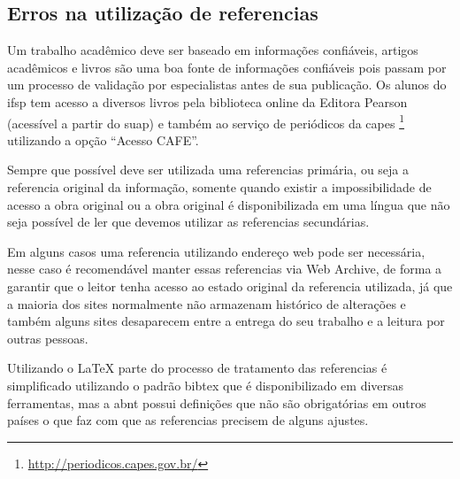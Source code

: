 \subsection{Erros na utilização de referencias}
\label{erros-referencias}

Um trabalho acadêmico deve ser baseado em informações confiáveis, artigos acadêmicos e livros são uma boa fonte de informações confiáveis pois passam por um processo de validação por especialistas antes de sua publicação. Os alunos do \ac{ifsp} tem acesso a diversos livros pela biblioteca online da Editora  Pearson (acessível a partir do \ac{suap}) e também ao serviço de periódicos da \ac{capes} \footnote{\url{http://periodicos.capes.gov.br/}} utilizando a opção \enquote{Acesso CAFE}.

Sempre que possível deve ser utilizada uma referencias primária, ou seja a referencia original da informação, somente quando existir a impossibilidade de acesso a obra original ou a obra original é disponibilizada em uma língua que não seja possível de ler que devemos utilizar as referencias secundárias.

Em alguns casos uma referencia utilizando endereço web pode ser necessária, nesse caso é recomendável manter essas referencias via  Web Archive, de forma a garantir que o leitor tenha acesso ao estado original da referencia utilizada, já que a maioria dos sites normalmente não armazenam histórico de alterações e também alguns sites desaparecem entre a entrega do seu trabalho e a leitura por outras pessoas.

Utilizando o {\LaTeX} parte do processo de tratamento das referencias é simplificado utilizando o padrão bibtex que é disponibilizado em diversas ferramentas, mas a \ac{abnt} possui definições que não são obrigatórias em outros países o que faz com que as referencias precisem de alguns ajustes.


\begin{itemize}


    
\end{itemize}



